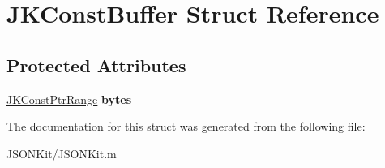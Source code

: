 \hypertarget{struct_j_k_const_buffer}{\section{J\+K\+Const\+Buffer Struct Reference}
\label{struct_j_k_const_buffer}
}
\subsection*{Protected Attributes}
\begin{DoxyCompactItemize}
\item 
\hypertarget{struct_j_k_const_buffer_ac9eed12dee7b6758b0672a86ba4d1e73}{\hyperlink{struct_j_k_const_ptr_range}{J\+K\+Const\+Ptr\+Range} {\bfseries bytes}}\label{struct_j_k_const_buffer_ac9eed12dee7b6758b0672a86ba4d1e73}

\end{DoxyCompactItemize}


The documentation for this struct was generated from the following file\+:\begin{DoxyCompactItemize}
\item 
J\+S\+O\+N\+Kit/J\+S\+O\+N\+Kit.\+m\end{DoxyCompactItemize}
